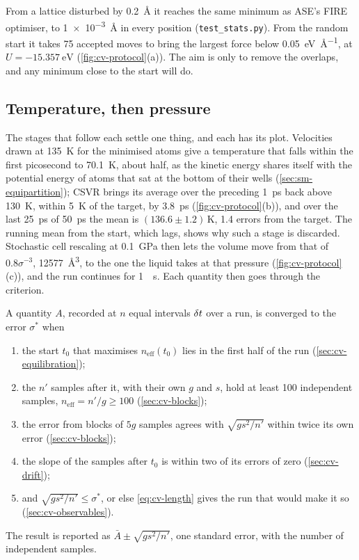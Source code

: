 \noindent From a lattice disturbed by \SI{0.2}{\angstrom} it reaches the same
minimum as ASE's FIRE optimiser, to \SI{1e-3}{\angstrom} in every position
(\texttt{test\_stats.py}). From the random start it takes 75 accepted moves
to bring the largest force below \SI{0.05}{\electronvolt\per\angstrom}, at
$U = \SI{-15.357}{\electronvolt}$ (\cref{fig:cv-protocol}(a)). The aim is
only to remove the overlaps, and any minimum close to the start will
do.

\subsection*{Temperature, then pressure}

The stages that follow each settle one thing, and each has its plot.
Velocities drawn at \SI{135}{\kelvin} for the minimised atoms give a
temperature that falls within the first picosecond to \SI{70.1}{\kelvin},
about half, as the kinetic energy shares itself with the potential energy
of atoms that sat at the bottom of their wells (\cref{sec:sm-equipartition});
CSVR brings its average over the preceding \SI{1}{\pico\second} back above
\SI{130}{\kelvin}, within \SI{5}{\kelvin} of the target, by
\SI{3.8}{\pico\second} (\cref{fig:cv-protocol}(b)), and over the last
\SI{25}{\pico\second} of \SI{50}{\pico\second} the mean is $(136.6 \pm
1.2)$\,\si{\kelvin}, 1.4 errors from the target. The running mean from the start, which lags, shows
why such a stage is discarded. Stochastic cell rescaling at
\SI{0.1}{\giga\pascal} then lets the volume move from that of
$0.8\sigma^{-3}$, \SI{12577}{\angstrom\cubed}, to the one the liquid takes
at that pressure (\cref{fig:cv-protocol}(c)), and the run continues for \SI{1}{\nano
\second}. Each quantity then goes through the criterion.

\begin{definition}
A quantity $A$, recorded at $n$ equal intervals $\delta t$ over a run, is
converged to the error $\sigma^\ast$ when
\begin{enumerate}
\item the start $t_0$ that maximises $n_{\mathrm{eff}}(t_0)$ lies in the
   first half of the run (\cref{sec:cv-equilibration});
\item the $n'$ samples after it, with their own $g$ and $s$, hold at least
   100 independent samples, $n_{\mathrm{eff}} = n'/g \ge 100$
   (\cref{sec:cv-blocks});
\item the error from blocks of $5g$ samples agrees with $\sqrt{g s^2/n'}$
   within twice its own error (\cref{sec:cv-blocks});
\item the slope of the samples after $t_0$ is within two of its errors of
   zero (\cref{sec:cv-drift});
\item and $\sqrt{g s^2/n'} \le \sigma^\ast$, or else \cref{eq:cv-length}
   gives the run that would make it so (\cref{sec:cv-observables}).
\end{enumerate}
The result is reported as $\bar A \pm \sqrt{g s^2/n'}$, one standard
error, with the number of independent samples.
\end{definition}


